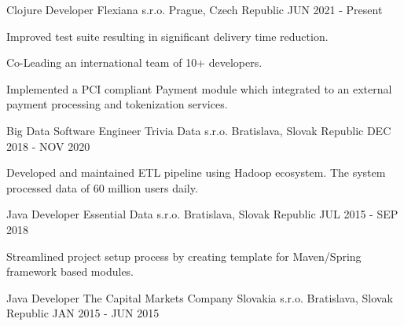 

\begin{cventries}

  \cventry
    {Clojure Developer} %
    {Flexiana s.r.o.} %
    {Prague, Czech Republic} %
    {JUN 2021 - Present} %
    {
      \begin{cvitems} %
        \item {Improved test suite resulting in significant delivery time reduction.}
        \item {Co-Leading an international team of 10+ developers.}
        \item {Implemented a PCI compliant Payment module which integrated to an external payment processing and tokenization services.}
      \end{cvitems}
    }

  \cventry
    {Big Data Software Engineer} %
    {Trivia Data s.r.o.} %
    {Bratislava, Slovak Republic} %
    {DEC 2018 - NOV 2020} %
    {
      \begin{cvitems} %
        \item {Developed and maintained ETL pipeline using Hadoop ecosystem. The system processed data of 60 million users daily.}
      \end{cvitems}
    }

  \cventry
    {Java Developer} %
    {Essential Data s.r.o.} %
    {Bratislava, Slovak Republic} %
    {JUL 2015 - SEP 2018} %
    {
      \begin{cvitems} %
        \item {Streamlined project setup process by creating template for Maven/Spring framework based modules.}
      \end{cvitems}
    }
    
  \cventry
    {Java Developer} %
    {The Capital Markets Company Slovakia s.r.o.} %
    {Bratislava, Slovak Republic} %
    {JAN 2015 - JUN 2015} %
    {
    }


\end{cventries}
